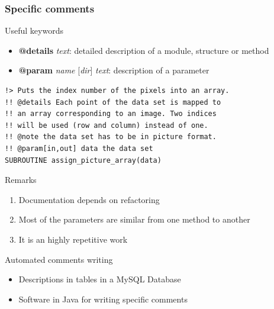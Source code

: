 \documentclass[10p]{beamer}
\begin{document}
\begin{frame}
\frametitle{Specific comments}
\begin{block}{Useful keywords}
\begin{itemize}
\item \textbf{@details} \textit{text}: detailed description of a module, structure or method
\item \textbf{@param} \textit{name} [\textit{dir}] \textit{text}: description of a parameter 
\end{itemize}
\end{block}
\begin{example}
\begin{lstlisting}
!> Puts the index number of the pixels into an array.
!! @details Each point of the data set is mapped to 
!! an array corresponding to an image. Two indices 
!! will be used (row and column) instead of one.
!! @note the data set has to be in picture format.
!! @param[in,out] data the data set
SUBROUTINE assign_picture_array(data)
\end{lstlisting}
\end{example}

\begin{alertblock}{Remarks}
\begin{enumerate}
\item Documentation depends on refactoring
\item Most of the parameters are similar from one method to another
\item It is an highly repetitive work
\end{enumerate}
\end{alertblock}
\begin{block}{Automated comments writing}
\begin{itemize}
\item Descriptions in tables in a MySQL Database
\item Software in Java for writing specific comments
\end{itemize}
\end{block}
\end{frame}
\end{document}
